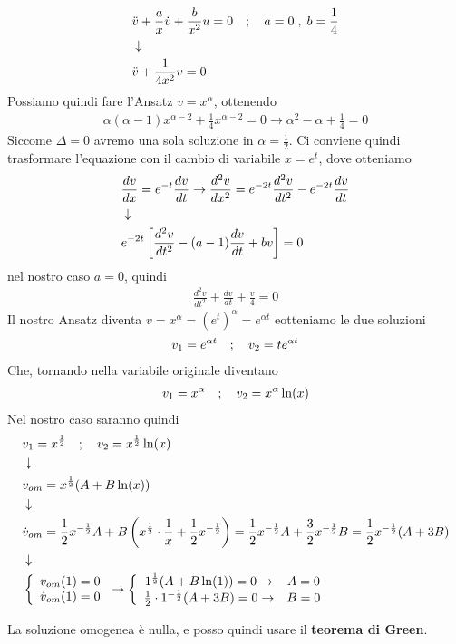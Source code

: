 \begin{align}
	&\ddot{v}  + \frac{a}{x} \dot{v} + \frac{b}{x^2} u = 0 \quad ; \quad a=0 \; , \; b= \frac{1}{4} \\ &\downarrow \nonumber \\
	&	\ddot{v} +\frac{1}{4x^2} v = 0 
\end{align}
Possiamo quindi fare l'Ansatz $v = x^\alpha$, ottenendo
\begin{align}
	\alpha (\alpha -1) x^{\alpha -2} +\frac{1}{4} x^{\alpha -2} = 0 \to \alpha^2 - \alpha + \frac{1}{4} = 0 
\end{align}
Siccome $\Delta = 0$ avremo una sola soluzione in $\alpha = \frac{1}{2}$. Ci conviene quindi trasformare l'equazione con il cambio di variabile $x=e^{t}$, dove otteniamo
\begin{align}
	&\frac{dv}{dx} = e^{-t}\frac{dv}{dt} \to \frac{d^2v}{dx^2} = e^{-2t}\frac{d^2 v}{dt^2} - e^{-2t}\frac{dv}{dt} \\ &\downarrow \nonumber \\
	&e^{-2t} \left[ \frac{d^2 v}{dt^2} - (a-1) \frac{dv}{dt} + bv\right] = 0
\end{align}
nel nostro caso $a=0$, quindi
\begin{align}
	\frac{d^2 v}{dt^2} + \frac{dv}{dt} + \frac{v}{4}= 0
\end{align}
Il nostro  Ansatz diventa $v = x^\alpha = (e^t)^\alpha  = e^{\alpha t}$ eotteniamo le due soluzioni
\begin{align}
	v_1 = e^{\alpha t} \quad ; \quad v_2 = t e^{\alpha t} 
\end{align}
Che, tornando nella variabile originale diventano
\begin{align}
	v_1 = x^\alpha \quad ; \quad v_2 = x^\alpha \ln(x) 
\end{align}
Nel nostro caso saranno quindi
\begin{align}
	&v_1 = x^\frac{1}{2} \quad ; \quad v_2 = x^\frac{1}{2} \ln(x) \\ &\downarrow \nonumber \\
	&v_{om} = x^\frac{1}{2}(A + B\ln(x)) \\ &\downarrow \nonumber \\
	&\dot{v}_{om} = \frac{1}{2}x^{-\frac{1}{2}}A + B \left( x^\frac{1}{2} \cdot \frac{1}{x} + \frac{1}{2}x^{-\frac{1}{2}} \right) = \frac{1}{2}x^{-\frac{1}{2}} A + \frac{3}{2}x^{-\frac{1}{2}} B = \frac{1}{2}x^{-\frac{1}{2}} (A + 3B) \nonumber \\ &\downarrow \nonumber \\
	&\left\{ \begin{array}{cc} v_{om}(1) = 0\\ \dot{v}_{om}(1) = 0 \end{array} \right. \to \left\{ \begin{array}{cc} 1^\frac{1}{2}(A + B\ln(1)) = 0 \to& A = 0\\ \frac{1}{2}\cdot 1^{-\frac{1}{2}} (A + 3B)=0 \to& B = 0 \end{array} \right.
\end{align}

La soluzione omogenea è nulla, e posso quindi usare il \textbf{teorema di Green}.

